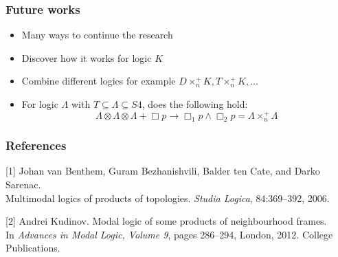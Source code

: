 \documentclass[hyperref={pdfpagelabels=false},t,10pt]{beamer}
\begin{document}
\begin{frame}
  \frametitle{Future works}
  \begin{itemize}
    \item Many ways to continue the research
    \item Discover how it works for logic $K$
    \item Combine different logics for example $D \times_n^+ K, T \times_n^+ K, ...$
    \item For logic $\Lambda$ with $T \subseteq \Lambda \subseteq S4$, does the following hold:
     $$\Lambda \otimes \Lambda \otimes \Lambda + \Box p \rightarrow \Box_1 p \land \Box_2 p = \Lambda \times_n^+ \Lambda$$
  
  \end{itemize}
\end{frame}

\begin{frame}
  \vspace{3.5cm}
  \centering
\end{frame}

\begin{frame}
  \frametitle{References}
    [1] Johan van Benthem, Guram Bezhanishvili, Balder ten Cate, and Darko Sarenac.\\
    Multimodal logics of products of topologies. \textit{Studia Logica}, 84:369–392, 2006. \newline

    [2] Andrei Kudinov. Modal logic of some products of neighbourhood frames.\\
    In \textit{Advances in Modal Logic, Volume 9}, pages 286–294, London, 2012. College Publications.
\end{frame}
\end{document}
